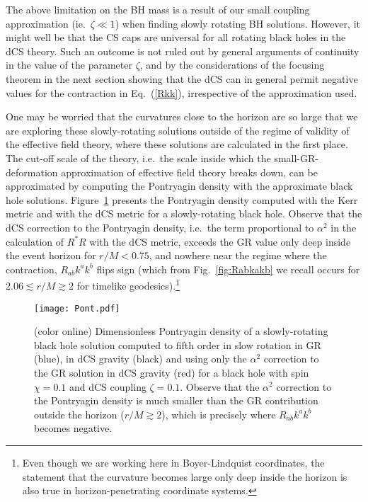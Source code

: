 \documentclass[prd,twocolumn,showpacs,superscriptaddress,nofootinbib]{revtex4-2}
\begin{document}
The above limitation on the BH mass is  a result of our small coupling approximation (ie.~$\zeta \ll 1$) when finding slowly rotating 
BH solutions.  However, it might well be  that the CS caps are universal  for all rotating black holes 
in the dCS theory. Such an outcome is not ruled out  by  general arguments  of continuity in the value of the 
parameter $\zeta$,  and by the considerations of the focusing theorem in the next section showing that the 
dCS can in general permit negative values for the contraction in Eq.~(\ref {Rkk}), irrespective of 
the approximation used. 


 
 




One may be worried that the curvatures close to the horizon are so large that we are exploring these slowly-rotating solutions outside of the regime of validity of the effective field theory, where these solutions are calculated in the first place. The cut-off scale of the theory, i.e.~the scale inside which the small-GR-deformation approximation of effective field theory breaks down, can be approximated by computing the Pontryagin density with the approximate black hole solutions. Figure~\ref{fig:Pont} presents the Pontryagin density computed with the Kerr metric  and with the dCS metric for a slowly-rotating black hole. Observe that the dCS correction to the Pontryagin density, i.e.~the term proportional to $\alpha^2$ in the calculation of $R^{*}R$ with the dCS metric,  exceeds the GR value only deep inside the event horizon for $r/M < 0.75$, and nowhere near the regime where the contraction, $R_{ab} k^a k^b$ flips sign (which from Fig.~\ref{fig:Rabkakb} we recall occurs for $2.06 \lesssim r/M \gtrsim 2$ for timelike geodesics).\footnote{Even though we are working here in Boyer-Lindquist coordinates, the statement that the curvature becomes large only deep inside the horizon is also true in horizon-penetrating coordinate systems.}   
% 
\begin{figure}
\texttt{[image: Pont.pdf]}
\caption{(color online) Dimensionless Pontryagin density of a slowly-rotating black hole solution computed to fifth order in slow rotation in GR (blue), in dCS gravity (black) and using only the $\alpha^2$ correction to the GR solution in dCS gravity (red) for a black hole with spin $\chi = 0.1$ and dCS coupling $\zeta = 0.1$. Observe that the $\alpha^2$ correction to the Pontryagin density is much smaller than the GR contribution outside the horizon ($r/M \gtrsim 2$), which is precisely where $R_{ab} k^a k^b$ becomes negative.}\label{fig:Pont}
\end{figure}
\end{document}
